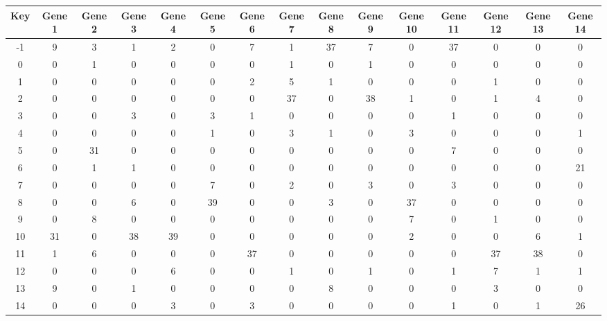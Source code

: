 \begin{tabular}{|c|c|c|c|c|c|c|c|c|c|c|c|c|c|c|}
\hline
Key & Gene 1 & Gene 2 & Gene 3 & Gene 4 & Gene 5 & Gene 6 & Gene 7 & Gene 8 & Gene 9 & Gene 10 & Gene 11 & Gene 12 & Gene 13 & Gene 14 \\
\hline
-1 & 9 & 3 & 1 & 2 & 0 & 7 & 1 & 37 & 7 & 0 & 37 & 0 & 0 & 0 \\
0 & 0 & 1 & 0 & 0 & 0 & 0 & 1 & 0 & 1 & 0 & 0 & 0 & 0 & 0 \\
1 & 0 & 0 & 0 & 0 & 0 & 2 & 5 & 1 & 0 & 0 & 0 & 1 & 0 & 0 \\
2 & 0 & 0 & 0 & 0 & 0 & 0 & 37 & 0 & 38 & 1 & 0 & 1 & 4 & 0 \\
3 & 0 & 0 & 3 & 0 & 3 & 1 & 0 & 0 & 0 & 0 & 1 & 0 & 0 & 0 \\
4 & 0 & 0 & 0 & 0 & 1 & 0 & 3 & 1 & 0 & 3 & 0 & 0 & 0 & 1 \\
5 & 0 & 31 & 0 & 0 & 0 & 0 & 0 & 0 & 0 & 0 & 7 & 0 & 0 & 0 \\
6 & 0 & 1 & 1 & 0 & 0 & 0 & 0 & 0 & 0 & 0 & 0 & 0 & 0 & 21 \\
7 & 0 & 0 & 0 & 0 & 7 & 0 & 2 & 0 & 3 & 0 & 3 & 0 & 0 & 0 \\
8 & 0 & 0 & 6 & 0 & 39 & 0 & 0 & 3 & 0 & 37 & 0 & 0 & 0 & 0 \\
9 & 0 & 8 & 0 & 0 & 0 & 0 & 0 & 0 & 0 & 7 & 0 & 1 & 0 & 0 \\
10 & 31 & 0 & 38 & 39 & 0 & 0 & 0 & 0 & 0 & 2 & 0 & 0 & 6 & 1 \\
11 & 1 & 6 & 0 & 0 & 0 & 37 & 0 & 0 & 0 & 0 & 0 & 37 & 38 & 0 \\
12 & 0 & 0 & 0 & 6 & 0 & 0 & 1 & 0 & 1 & 0 & 1 & 7 & 1 & 1 \\
13 & 9 & 0 & 1 & 0 & 0 & 0 & 0 & 8 & 0 & 0 & 0 & 3 & 0 & 0 \\
14 & 0 & 0 & 0 & 3 & 0 & 3 & 0 & 0 & 0 & 0 & 1 & 0 & 1 & 26 \\
\hline
\end{tabular}